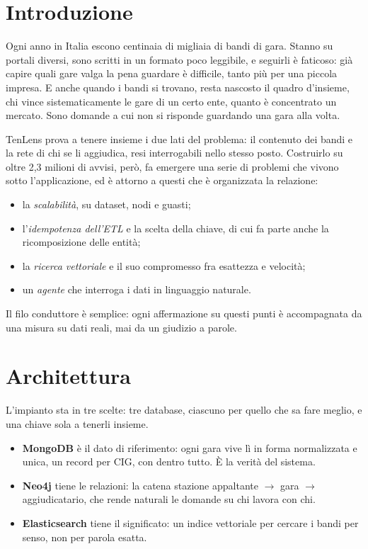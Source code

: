 \documentclass[11pt,a4paper]{article}
\begin{document}
\newpage
\tableofcontents
\newpage

\section{Introduzione}

Ogni anno in Italia escono centinaia di migliaia di bandi di gara. Stanno su portali diversi,
sono scritti in un formato poco leggibile, e seguirli è faticoso: già capire quali gare valga
la pena guardare è difficile, tanto più per una piccola impresa. E anche quando i bandi si
trovano, resta nascosto il quadro d'insieme, chi vince sistematicamente le gare di un certo
ente, quanto è concentrato un mercato. Sono domande a cui non si risponde guardando una gara
alla volta.

TenLens prova a tenere insieme i due lati del problema: il contenuto dei bandi e la rete di
chi se li aggiudica, resi interrogabili nello stesso posto. Costruirlo su oltre 2,3 milioni di
avvisi, però, fa emergere una serie di problemi che vivono sotto l'applicazione, ed è attorno
a questi che è organizzata la relazione:

\begin{itemize}
  \item la \emph{scalabilità}, su dataset, nodi e guasti;
  \item l'\emph{idempotenza dell'ETL} e la scelta della chiave, di cui fa parte anche la
        ricomposizione delle entità;
  \item la \emph{ricerca vettoriale} e il suo compromesso fra esattezza e velocità;
  \item un \emph{agente} che interroga i dati in linguaggio naturale.
\end{itemize}

\noindent
Il filo conduttore è semplice: ogni affermazione su questi punti è accompagnata da una misura
su dati reali, mai da un giudizio a parole.

\section{Architettura}

L'impianto sta in tre scelte: tre database, ciascuno per quello che sa fare meglio, e una
chiave sola a tenerli insieme.

\begin{itemize}
  \item \textbf{MongoDB} è il dato di riferimento: ogni gara vive lì in forma normalizzata e
        unica, un record per CIG, con dentro tutto. È la verità del sistema.
  \item \textbf{Neo4j} tiene le relazioni: la catena stazione appaltante $\rightarrow$ gara
        $\rightarrow$ aggiudicatario, che rende naturali le domande su chi lavora con chi.
  \item \textbf{Elasticsearch} tiene il significato: un indice vettoriale per cercare i bandi
        per senso, non per parola esatta.
\end{itemize}
\end{document}
